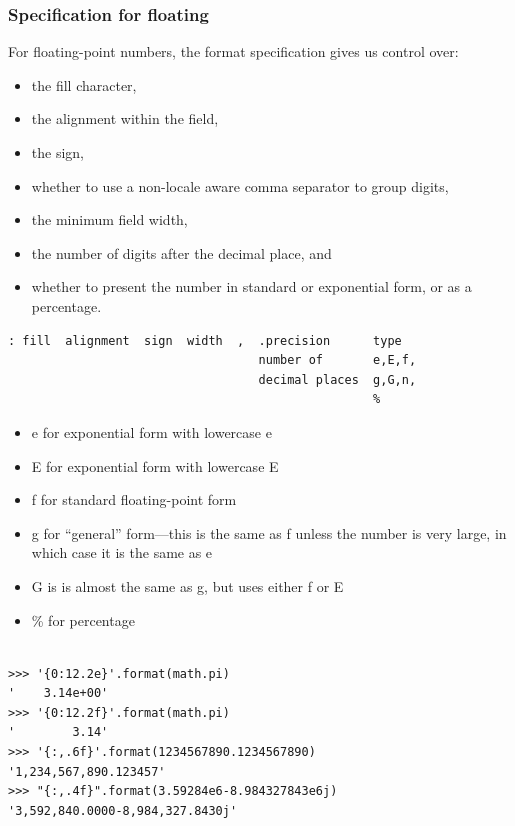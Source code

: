 \subsubsection{Specification for floating}


For floating-point numbers, the format specification gives us control over:
\begin{itemize}
\item the fill character, 
\item the alignment within the field, 
\item the sign, 
\item whether to use a non-locale aware comma separator to group digits, 
\item the minimum field width, 
\item the number of digits after the decimal place, and 
\item whether to present the number in standard or exponential form, or as a percentage.
\end{itemize}

\begin{tcolorbox}
\begin{verbatim}
: fill  alignment  sign  width  ,  .precision      type
                                   number of       e,E,f,
                                   decimal places  g,G,n,
                                                   %
\end{verbatim}
\end{tcolorbox}


\begin{itemize}
\item e for exponential form with lowercase e
\item E for exponential form with lowercase E
\item f for standard floating-point form
\item g for ``general'' form—this is the same as f unless the number is very large, in which case it is the same as e
\item G is is almost the same as g, but uses either f or E
\item \% for percentage
\end{itemize}


\begin{lstlisting}

>>> '{0:12.2e}'.format(math.pi)
'    3.14e+00'
>>> '{0:12.2f}'.format(math.pi)
'        3.14'
>>> '{:,.6f}'.format(1234567890.1234567890)
'1,234,567,890.123457'
>>> "{:,.4f}".format(3.59284e6-8.984327843e6j) 
'3,592,840.0000-8,984,327.8430j'
\end{lstlisting}





